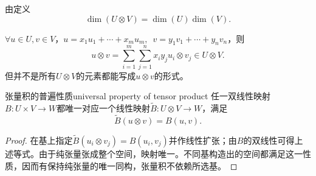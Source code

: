 \begin{corollary}
	由定义 
	\[
		\dim(U\otimes V)=\dim(U)\dim(V).
	\]
\end{corollary}
\begin{example}{}{}
	$\forall u\in U,v\in V$，$u=x_1u_1+\cdots+x_mu_m,\enspace v=y_1v_1+\cdots+y_nv_n$，则 
	\[
		u\otimes v=\sum_{i=1}^m\sum_{j=1}^nx_iy_ju_i\otimes v_j\in U\otimes V.
	\]
	但并不是所有$U\otimes V$的元素都能写成$u\otimes v$的形式。
\end{example}
\begin{theorem}{张量积的普遍性质}{universal property of tensor product}
    任一双线性映射$B:U\times V\to W$都唯一对应一个线性映射$\widetilde B:U\otimes V\to W$，满足
    \[
        \widetilde B(u\otimes v)=B(u,v).
    \]
\end{theorem}
\begin{proof}
    在基上指定$\widetilde B(u_i\otimes v_j)=B(u_i,v_j)$并作线性扩张；由$B$的双线性可得上述等式。由于纯张量张成整个空间，映射唯一。不同基构造出的空间都满足这一性质，因而有保持纯张量的唯一同构，张量积不依赖所选基。
\end{proof}

